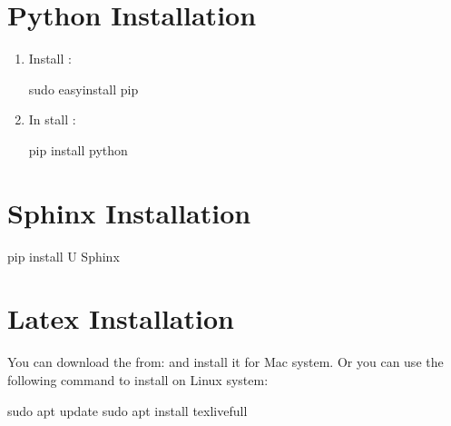 \documentclass[letterpaper,12pt,english]{sphinxmanual}
\begin{document}
\section{Python Installation}
\label{\detokenize{pkgs:python-installation}}\begin{enumerate}
\def\theenumi{\arabic{enumi}}
\def\labelenumi{\theenumi .}
\makeatletter\def\p@enumii{\p@enumi \theenumi .}\makeatother
\item {} 
Install :

\begin{sphinxVerbatim}[commandchars=\\\{\}]
sudo easy\PYGZus{}install pip
\end{sphinxVerbatim}

\item {} 
In stall :

\begin{sphinxVerbatim}[commandchars=\\\{\}]
pip install python
\end{sphinxVerbatim}

\end{enumerate}


\section{Sphinx Installation}
\label{\detokenize{pkgs:sphinx-installation}}
\begin{sphinxVerbatim}[commandchars=\\\{\}]
pip install \PYGZhy{}U Sphinx
\end{sphinxVerbatim}


\section{Latex Installation}
\label{\detokenize{pkgs:latex-installation}}
You can download the  from:  and install it for Mac system. Or you can use the following command to install  on Linux system:

\begin{sphinxVerbatim}[commandchars=\\\{\}]
sudo apt update  sudo apt install texlive\PYGZhy{}full
\end{sphinxVerbatim}
\end{document}
